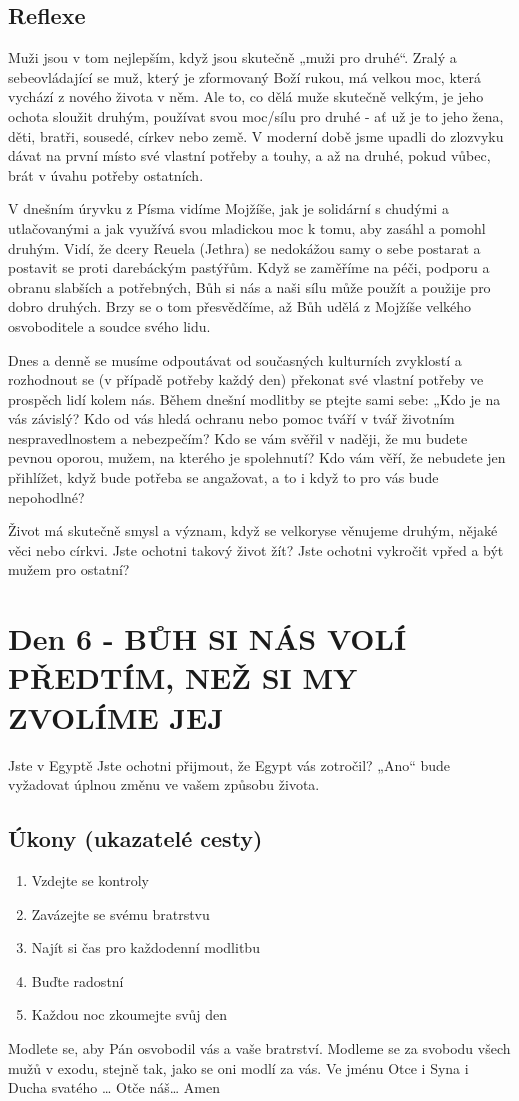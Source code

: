 \documentclass[11pt]{article}
\newcommand{\zacatekPrvniTyden}{
  Jste v Egyptě \newline
  Jste ochotni přijmout, že Egypt vás zotročil? „Ano“ bude vyžadovat úplnou změnu ve vašem způsobu života.

\subsection*{Úkony (ukazatelé cesty)}
\begin{enumerate}
  \item Vzdejte se kontroly
  \item Zavázejte se svému bratrstvu
  \item Najít si čas pro každodenní modlitbu
  \item Buďte radostní
  \item Každou noc zkoumejte svůj den
\end{enumerate}
Modlete se, aby Pán osvobodil vás a vaše bratrství. \newline
Modleme se za svobodu všech mužů v exodu, stejně tak, jako se oni modlí za vás.\newline
Ve jménu Otce i Syna i Ducha svatého …  Otče náš… Amen
}
\begin{document}
\subsection*{Reflexe}

Muži jsou v tom nejlepším, když jsou skutečně „muži pro druhé“. Zralý a sebeovládající se muž, který je zformovaný Boží rukou, má velkou moc, která vychází z nového života v něm.
Ale to, co dělá muže skutečně velkým, je jeho ochota sloužit druhým, používat svou moc/sílu pro druhé - ať už je to jeho žena, děti, bratři, sousedé, církev nebo země. V moderní době jsme upadli do zlozvyku dávat na první místo své vlastní potřeby a touhy, a až na druhé, pokud vůbec, brát v úvahu potřeby ostatních.

V dnešním úryvku z Písma vidíme Mojžíše, jak je solidární s chudými a utlačovanými a jak využívá svou mladickou moc k tomu, aby zasáhl a pomohl druhým. Vidí, že dcery Reuela (Jethra) se nedokážou samy o sebe postarat a postavit se proti darebáckým pastýřům.
Když se zaměříme na péči, podporu a obranu slabších a potřebných, Bůh si nás a naši sílu může použít a použije pro dobro druhých. Brzy se o tom přesvědčíme, až Bůh udělá z Mojžíše velkého osvoboditele a soudce svého lidu.

Dnes a denně se musíme odpoutávat od současných kulturních zvyklostí a rozhodnout se (v případě potřeby každý den) překonat své vlastní potřeby ve prospěch lidí kolem nás.
Během dnešní modlitby se ptejte sami sebe: „Kdo je na vás závislý? Kdo od vás hledá ochranu nebo pomoc tváří v tvář životním nespravedlnostem a nebezpečím? Kdo se vám svěřil v naději, že mu budete pevnou oporou, mužem, na kterého je spolehnutí? Kdo vám věří, že nebudete jen přihlížet, když bude potřeba se angažovat, a to i když to pro vás bude nepohodlné?

Život má skutečně smysl a význam, když se velkoryse věnujeme druhým, nějaké věci nebo církvi.
Jste ochotni takový život žít? Jste ochotni vykročit vpřed a být mužem pro ostatní?

\newpage
\section{Den 6 - BŮH SI NÁS VOLÍ PŘEDTÍM, NEŽ SI MY ZVOLÍME JEJ}
\zacatekPrvniTyden
\end{document}
